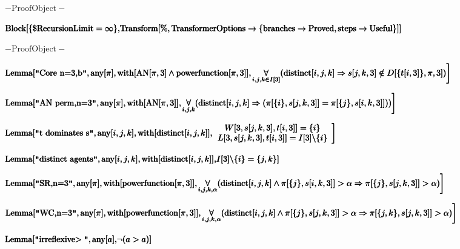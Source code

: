 \documentclass{article}
\begin{document}
\noindent\(- \text{ProofObject} -\)

\noindent\(\pmb{\text{Block}[\{\text{$\$$RecursionLimit}=\infty \},}\\
\pmb{\text{Transform}[\%,\text{TransformerOptions}\to \{\text{branches}\to \text{Proved},\text{steps}\to \text{Useful}\}]]}\)

\noindent\(- \text{ProofObject} -\)

\noindent\(\pmb{\text{Lemma}[\text{$\texttt{"}$Core n=3,b$\texttt{"}$}, \text{any}[\pi ],\text{with}[\text{AN}[\pi ,3]\land \text{powerfunction}[\pi
,3]],}\\
\pmb{\left.\underset{i,j,k\in I[3]}{\forall }(\text{distinct}[i,j,k]\Rightarrow s[j,k,3]\notin  D[\{t[i,3]\},\pi ,3])\right]}\)

\noindent\(\pmb{\text{Lemma}[\text{$\texttt{"}$AN perm,n=3$\texttt{"}$},\text{any}[\pi ],\text{with}[\text{AN}[\pi ,3]],}\\
\pmb{\left.\underset{i,j,k}{\forall }(\text{distinct}[i,j,k]\Rightarrow (\pi [\{i\},s[j,k,3]]=\pi [\{j\},s[i,k,3]]))\right]}\)

\noindent\(\pmb{\text{Lemma}[\text{$\texttt{"}$t dominates s$\texttt{"}$},\text{any}[i,j,k],\text{with}[\text{distinct}[i,j,k]],}\\
\pmb{\left.
\begin{array}{c}
 W[3,s[j,k,3],t[i,3]]=\{i\} \\
 L[3,s[j,k,3],t[i,3]]=I[3]\backslash \{i\}
\end{array}
\right]}\)

\noindent\(\pmb{\text{Lemma}[\text{$\texttt{"}$distinct agents$\texttt{"}$},\text{any}[i,j,k],\text{with}[\text{distinct}[i,j,k]],}\\
\pmb{I[3]\backslash \{i\}=\{j,k\}]}\)

\noindent\(\pmb{\text{Lemma}[\text{$\texttt{"}$SR,n=3$\texttt{"}$},\text{any}[\pi ],\text{with}[\text{powerfunction}[\pi ,3]],}\\
\pmb{\left.\underset{i,j,k,\alpha }{\forall }(\text{distinct}[i,j,k]\land \pi [\{j\},s[i,k,3]]>\alpha \Rightarrow \pi [\{j\},s[j,k,3]]>\alpha )\right]}\)

\noindent\(\pmb{\text{Lemma}[\text{$\texttt{"}$WC,n=3$\texttt{"}$},\text{any}[\pi ],\text{with}[\text{powerfunction}[\pi ,3]],}\\
\pmb{\left.\underset{i,j,k,\alpha }{\forall }(\text{distinct}[i,j,k]\land \pi [\{j\},s[j,k,3]]>\alpha \Rightarrow \pi [\{j,k\},s[j,k,3]]>\alpha )\right]}\)

\noindent\(\pmb{\text{Lemma}[\text{$\texttt{"}$irreflexive$>\texttt{"}$},\text{any}[a],}\\
\pmb{\neg (a>a)]}\)
\end{document}
